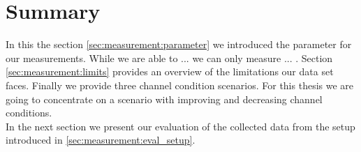 %
\newpage
%
 

\section{Summary}

In this the section \ref{sec:measurement:parameter} we introduced the parameter for our measurements. While we are able to ... we can only measure ... . Section \ref{sec:measurement:limits} provides an overview of the limitations our data set faces. Finally we provide three channel condition scenarios. For this thesis we are going to concentrate on a scenario with improving and decreasing channel conditions.\\
In the next section we present our evaluation of the collected data from the setup introduced in \ref{sec:measurement:eval_setup}.\\


%
